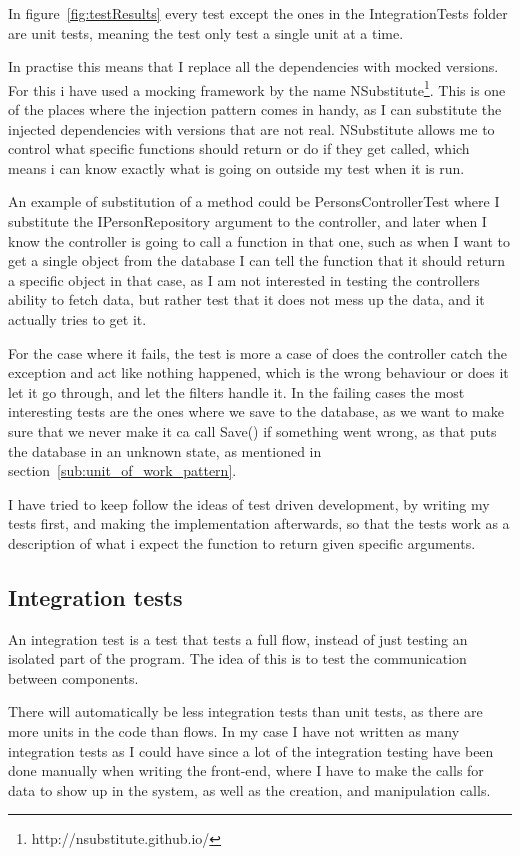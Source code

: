 In figure~\ref{fig:testResults} every test except the ones in the
IntegrationTests folder are unit tests, meaning the test only test a single unit
at a time.

In practise this means that I replace all the dependencies with mocked versions.
For this i have used a mocking framework by the name
NSubstitute\footnote{http://nsubstitute.github.io/}. This is one of the places
where the injection pattern comes in handy, as I can substitute the injected
dependencies with versions that are not real. NSubstitute allows me to control
what specific functions should return or do if they get called, which means i
can know exactly what is going on outside my test when it is run.

An example of substitution of a method could be PersonsControllerTest where I
substitute the IPersonRepository argument to the controller, and later when I
know the controller is going to call a function in that one, such as when I want
to get a single object from the database I can tell the function that it should
return a specific object in that case, as I am not interested in testing the
controllers ability to fetch data, but rather test that it does not mess up the
data, and it actually tries to get it. 

For the case where it fails, the test is more a case of does the controller
catch the exception and act like nothing happened, which is the wrong behaviour
or does it let it go through, and let the filters handle it. In the failing
cases the most interesting tests are the ones where we save to the database, as
we want to make sure that we never make it ca call Save() if something went
wrong, as that puts the database in an unknown state, as mentioned in
section~\ref{sub:unit_of_work_pattern}.

I have tried to keep follow the ideas of test driven development, by writing my
tests first, and making the implementation afterwards, so that the tests work as
a description of what i expect the function to return given specific arguments.

\subsection{Integration tests}
\label{sec:integration_tests}
An integration test is a test that tests a full flow, instead of just testing an
isolated part of the program. The idea of this is to test the communication
between components.

There will automatically be less integration tests than unit tests, as there are
more units in the code than flows. In my case I have not written as many
integration tests as I could have since a lot of the integration testing have
been done manually when writing the front-end, where I have to make the calls for
data to show up in the system, as well as the creation, and manipulation calls.

